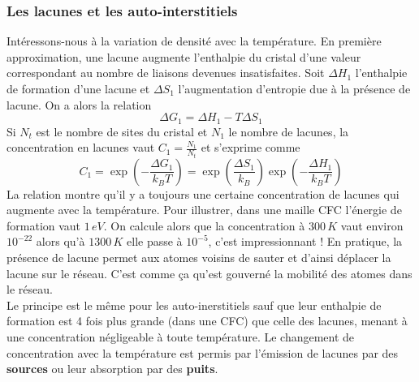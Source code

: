 	\subsubsection{Les lacunes et les auto-interstitiels}
			Intéressons-nous à la variation de densité avec la température. En première approximation, une lacune augmente l'enthalpie du cristal d'une valeur correspondant au nombre de liaisons devenues insatisfaites. Soit $\Delta H_1$ l'enthalpie de formation d'une lacune et $\Delta S_1$ l'augmentation d'entropie due à la présence de lacune. On a alors la relation 
			\begin{equation}
				\Delta G_1 = \Delta H_1 - T\Delta S_1
			\end{equation}
			Si $N_t$ est le nombre de sites du cristal et $N_1$ le nombre de lacunes, la concentration en lacunes vaut $C_1 = \frac{N_1}{N_t}$ et s'exprime comme
			\begin{equation}
				C_1 = \exp \left( -\frac{\Delta G_1}{k_B T} \right) = \exp \left( \frac{\Delta S_1}{k_B} \right)\exp \left( -\frac{\Delta H_1}{k_B T} \right)
			\end{equation}
			La relation montre qu'il y a toujours une certaine concentration de lacunes qui augmente avec la température. Pour illustrer, dans une maille CFC l'énergie de formation vaut $1\, eV$. On calcule alors que la concentration à $300\, K$ vaut environ $10^{-22}$ alors qu'à $1300\, K$ elle passe à $10^{-5}$, c'est impressionnant ! En pratique, la présence de lacune permet aux atomes voisins de sauter et d'ainsi déplacer la lacune sur le réseau. C'est comme ça qu'est gouverné la mobilité des atomes dans le réseau. \\
			Le principe est le même pour les auto-inerstitiels sauf que leur enthalpie de formation est 4 fois plus grande (dans une CFC) que celle des lacunes, menant à une concentration négligeable à toute température. Le changement de concentration avec la température est permis par l'émission de lacunes par des \textbf{sources} ou leur absorption par des \textbf{puits}. 
			
